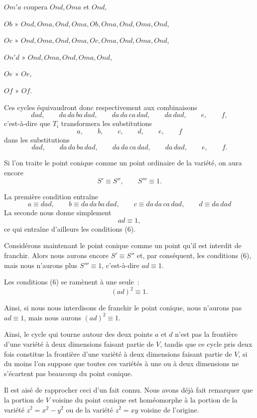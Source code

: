 \documentclass{article}
\begin{document}
$Om'a$ coupera $Ond, Oma$ et $Ond$,

$Ob$ » $Ond, Oma, Ond, Oma, Ob, Oma, Ond, Oma, Ond$,

$Oc$ » $Ond, Oma, Ond, Oma, Oc, Oma, Ond, Oma, Ond$,

$On'd$ » $Ond, Oma, Ond, Oma, Ond$,

$Oe$ » $Oe$,

$Of$ » $Of$.

Ces cycles équivaudront donc respectivement aux combinaisons
\[ dad, \qquad da\,da\,ba\,dad, \qquad da\,da\,ca\,dad, \qquad da\,dad, \qquad e, \qquad f, \]
c'est-à-dire que $T_{i}$ transformera les substitutions
\[ a, \qquad b, \qquad c, \qquad d, \qquad e, \qquad f \]
dans les substitutions
\[ dad, \qquad da\,da\,ba\,dad, \qquad da\,da\,ca\,dad, \qquad da\,dad, \qquad e, \qquad f. \]

Si l'on traite le point conique comme un point ordinaire de la variété, on aura encore
\[ S' \equiv S'', \qquad S''' \equiv 1. \]

La première condition entraîne
\[ a \equiv dad, \qquad b \equiv da\,da\,ba\,dad, \qquad c \equiv da\,da\,ca\,dad, \qquad d \equiv da\,dad \tag{6} \]
La seconde nous donne simplement
\[ ad \equiv 1, \]
ce qui entraîne d'ailleurs les conditions (6).

Considérons maintenant le point conique comme un point qu'il est interdit de franchir. Alors nous aurons encore $S' \equiv S''$ et, par conséquent, les conditions (6), mais nous n'aurons plus $S''' \equiv 1$, c'est-à-dire $ad \equiv 1$.

Les conditions (6) se ramènent à une seule~:
\[ (ad)^{2} \equiv 1. \]

Ainsi, si nous nous interdisons de franchir le point conique, nous n'aurons pas $ad \equiv 1$, mais nous aurons $(ad)^{2} \equiv 1$.

Ainsi, le cycle qui tourne autour des deux points $a$ et $d$ n'est pas la frontière d'une variété à deux dimensions faisant partie de $V$, tandis que ce cycle pris deux fois constitue la frontière d'une variété à deux dimensions faisant partie de $V$, si du moins l'on suppose que toutes ces variétés à une ou à deux dimensions ne s'écartent pas beaucoup du point conique.

Il est aisé de rapprocher ceci d'un fait connu. Nous avons déjà fait remarquer que la portion de $V$ voisine du point conique est homéomorphe à la portion de la variété $z^{2} = x^{2} - y^{2}$ ou de la variété $z^{2} = xy$ voisine de l'origine.
\end{document}
